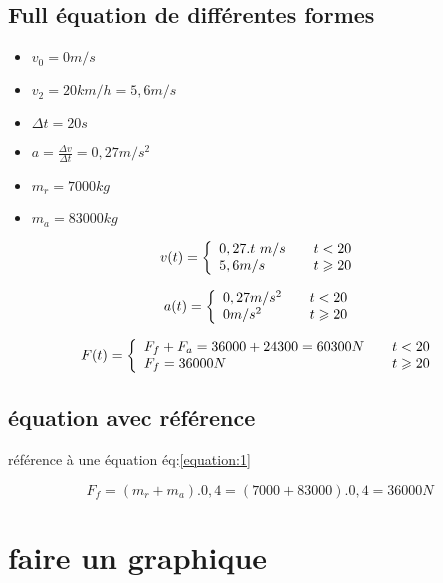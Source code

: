 \documentclass{report}
\begin{document}
\subsection{Full équation de différentes formes}


\begin{multicols}{2}
\begin{itemize}
    \item $v_0 = 0 m/s$
\item $v_2 = 20 km/h = 5,6 m/s$
\item $\Delta t = 20 s$
\item $a = \frac{\Delta v}{\Delta t} = 0,27 m/s^2$
\item $m_r = 7 000 kg$
\item $m_a = 83 000 kg$
\end{itemize} 
\end{multicols}
\[v(t) = \left\{ 
\begin{array}{l l}
  0,27.t\ m/s & \quad \text{$t<20$}\\
  5,6 m/s & \quad \text{$t\geqslant 20$}\\ \end{array} \right. \]


\[a(t) = \left\{ 
\begin{array}{l l}
  0,27 m/s^2 & \quad \text{$t<20$}\\
  0 m/s^2 & \quad \text{$t\geqslant 20$}\\ \end{array} \right. \]
  
\[F(t) = \left\{ 
\begin{array}{l l}
  F_f +F_a = 36000 + 24300 = 60300 N & \quad \text{$t<20$}\\
  F_f = 36000 N & \quad \text{$t\geqslant 20$}\\ \end{array} \right. \]
  
\subsection{équation avec référence}

 référence à une équation éq:\ref{equation:1}

\begin{equation} \label{equation:1}
F_f = (m_r + m_a).0,4 = (7000 + 83000).0,4 = 36000N
\end{equation}




\section{faire un graphique}
\end{document}
